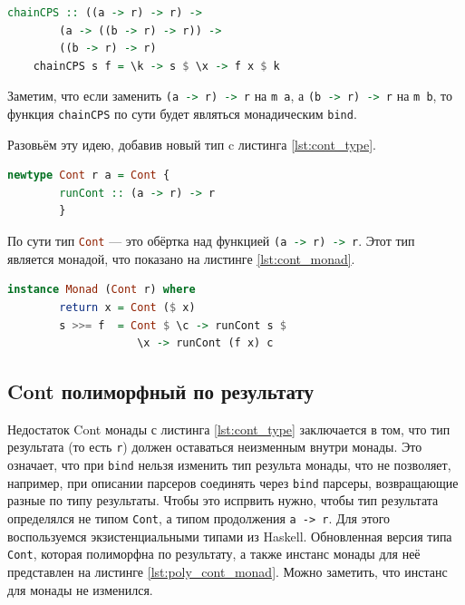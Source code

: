 \documentclass[times]{itmo-student-thesis}
\begin{document}
\begin{lstlisting}[language=Haskell,float=!h,caption={Соединение отложенных вычислений},label={lst:cps_bind}]
    chainCPS :: ((a -> r) -> r) -> 
        (a -> ((b -> r) -> r)) -> 
        ((b -> r) -> r)
    chainCPS s f = \k -> s $ \x -> f x $ k
\end{lstlisting}


Заметим, что если заменить \lstinline[language=Haskell]{(a -> r) -> r} на \lstinline[language=Haskell]{m a}, а 
\lstinline[language=Haskell]{(b -> r) -> r} на \lstinline[language=Haskell]{m b}, то функция \lstinline[language=Haskell]{chainCPS}
по сути будет являться монадическим \lstinline[language=Haskell]{bind}.

Разовьём эту идею, добавив новый тип c листинга \ref{lst:cont_type}.

\begin{lstlisting}[language=Haskell,float=!h,caption={Тип Cont},label={lst:cont_type}]
    newtype Cont r a = Cont { 
        runCont :: (a -> r) -> r 
        }
\end{lstlisting}

По сути тип \lstinline[language=Haskell]{Cont} --- это обёртка над функцией \lstinline[language=Haskell]{(a -> r) -> r}.
Этот тип является монадой, что показано на листинге \ref{lst:cont_monad}.

\begin{lstlisting}[language=Haskell,float=!h,caption={Инстанс Monad для Cont},label={lst:cont_monad}]
    instance Monad (Cont r) where
        return x = Cont ($ x)
        s >>= f  = Cont $ \c -> runCont s $ 
                    \x -> runCont (f x) c
\end{lstlisting}

\subsection{Cont полиморфный по результату}\label{sec:poly_cont_monad}

Недостаток Cont монады с листинга \ref{lst:cont_type} заключается в том, что тип результата (то есть
\lstinline{r}) должен оставаться  неизменным внутри монады. Это означает, что при \lstinline{bind} нельзя изменить
тип результа монады, что не позволяет, например, при описании парсеров соединять через \lstinline{bind} парсеры,
возвращающие разные по типу результаты. Чтобы это испрвить нужно, чтобы тип результата определялся не типом
\lstinline{Cont}, а типом продолжения \lstinline{a -> r}. Для этого воспользуемся экзистенциальными типами из Haskell.
Обновленная версия типа \lstinline{Cont}, которая полиморфна по результату, а также инстанс монады для неё
представлен  на листинге \ref{lst:poly_cont_monad}. Можно заметить, что инстанс для монады не изменился.
\end{document}
